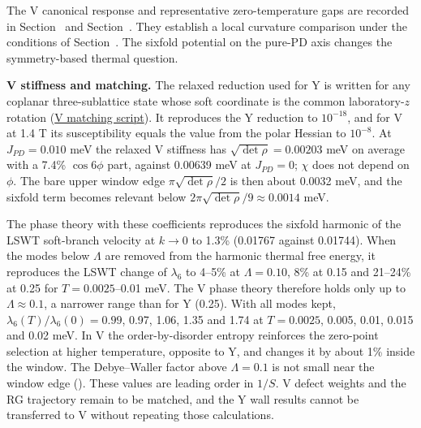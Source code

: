 The V canonical response and representative zero-temperature gaps are
recorded in Section~ and Section~. They
establish a local curvature comparison under the conditions of
Section~. The sixfold potential on the pure-PD
axis changes the symmetry-based thermal question.

\textbf{V stiffness and matching.} The relaxed reduction used for Y is
written for any coplanar three-sublattice state whose soft coordinate is
the common laboratory-\(z\) rotation
(\href{../../../examples/nbcp_v_matching_debye_waller.py}{V matching
script}). It reproduces the Y reduction to \(10^{-18}\), and for V at
1.4 T its susceptibility equals the value from the polar Hessian to
\(10^{-8}\). At \(J_{PD}=0.010\) meV the relaxed V stiffness has
\(\sqrt{\det\rho}=0.00203\) meV on average with a 7.4\% \(\cos6\phi\)
part, against 0.00639 meV at \(J_{PD}=0\); \(\chi\) does not depend on
\(\phi\). The bare upper window edge \(\pi\sqrt{\det\rho}/2\) is then
about 0.0032 meV, and the sixfold term becomes relevant below
\(2\pi\sqrt{\det\rho}/9\approx0.0014\) meV.

The phase theory with these coefficients reproduces the sixfold harmonic
of the LSWT soft-branch velocity at \(k\to0\) to 1.3\% (0.01767 against
0.01744). When the modes below \(\Lambda\) are removed from the harmonic
thermal free energy, it reproduces the LSWT change of \(\lambda_6\) to
4--5\% at \(\Lambda=0.10\), 8\% at 0.15 and 21--24\% at 0.25 for
\(T=0.0025\)--0.01 meV. The V phase theory therefore holds only up to
\(\Lambda\approx0.1\), a narrower range than for Y (0.25). With all modes
kept, \(\lambda_6(T)/\lambda_6(0)=0.99\), 0.97, 1.06, 1.35 and 1.74 at
\(T=0.0025\), 0.005, 0.01, 0.015 and 0.02 meV. In V the order-by-disorder
entropy reinforces the zero-point selection at higher temperature,
opposite to Y, and changes it by about 1\% inside the window. The
Debye--Waller factor above \(\Lambda=0.1\) is not small near the window
edge (). These values are leading order in \(1/S\).
V defect weights and the RG trajectory remain to be matched, and the Y
wall results cannot be transferred to V without repeating those
calculations.
